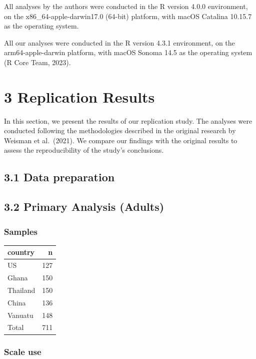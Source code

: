 \documentclass[
  man]{apa6}
\begin{document}
All analyses by the authors were conducted in the R version 4.0.0
environment, on the x86\_64-apple-darwin17.0 (64-bit) platform, with
macOS Catalina 10.15.7 as the operating system.

All our analyses were conducted in the R version 4.3.1 environment, on the arm64-apple-darwin platform, with macOS Sonoma 14.5 as the operating system (R Core Team, 2023).

\hypertarget{replication-results}{%
\section{3 Replication Results}\label{replication-results}}

In this section, we present the results of our replication study. The
analyses were conducted following the methodologies described in the
original research by Weisman et al.~(2021). We compare our findings with
the original results to assess the reproducibility of the study's
conclusions.

\hypertarget{data-preparation}{%
\subsection{3.1 Data preparation}\label{data-preparation}}

\hypertarget{primary-analysis-adults}{%
\subsection{3.2 Primary Analysis (Adults)}\label{primary-analysis-adults}}

\hypertarget{samples}{%
\subsubsection{Samples}\label{samples}}

\begin{tabular}{l|r}
\hline
country & n\\
\hline
US & 127\\
\hline
Ghana & 150\\
\hline
Thailand & 150\\
\hline
China & 136\\
\hline
Vanuatu & 148\\
\hline
Total & 711\\
\hline
\end{tabular}

\hypertarget{scale-use}{%
\subsubsection{Scale use}\label{scale-use}}
\end{document}
